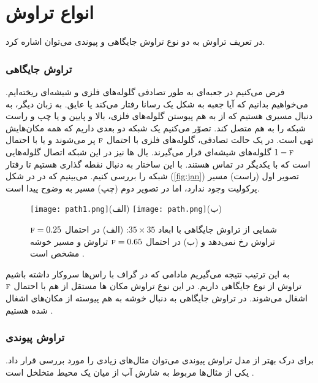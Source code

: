 

\section{انواع تراوش}
در تعریف تراوش به دو نوع تراوش جایگاهی و پیوندی می‌توان اشاره کرد\cite{percolate}. 
\subsubsection{تراوش جایگاهی}
فرض می‌کنیم در جعبه‌ای به طور تصادفی گلوله‌های فلزی و شیشه‌ای ریخته‌ایم. می‌خواهیم بدانیم که آیا جعبه به شکل یک رسانا رفتار می‌کند یا عایق. به زبان دیگر، به دنبال مسیری هستیم که از به هم پیوستن گلوله‌های فلزی، بالا و پایین و یا چپ و راست شبکه را به هم متصل کند. تصوّر می‌کنیم یک شبکه دو بعدی داریم که همه مکان‌هایش تهی است. در یک حالت تصادفی، گلوله‌های فلزی  با احتمال 
$\textsc{f}$
 پر می‌شوند و یا با احتمال
  $1 - \textsc{f}$ 
  گلوله‌های شیشه‌ای قرار می‌گیرند. یال ها نیز در این شبکه اتصال گلوله‌هایی است که با یکدیگر در تماس هستند. با این ساختار به دنبال نقطه گذاری هستیم تا رفتار شبکه را بررسی کنیم. می‌بینیم که در در شکل (\ref{fig:jan})  تصویر اول (راست) مسیر پرکولیت وجود ندارد، اما  در تصویر دوم (چپ) مسیر به وضوح پیدا است. 
\begin{figure}[htbp]
\hspace*{0cm}
\centering
\texttt{[image: path1.png]}\centering(الف)    
\texttt{[image: path.png]}\centering(ب)
\caption[شمایی از تراوش جایگاهی] {\footnotesize شمایی از تراوش جایگاهی با ابعاد $35\times 35$: (الف) در احتمال 
$\textsc{f} = 0.25$ 
تراوش رخ نمی‌دهد و (ب) در احتمال 
$\textsc{f} = 0.65$ 
تراوش و مسیر خوشه مشخص است \cite{bela}.}
\label{fig:site}
\end{figure}
به این ترتیب نتیجه می‌گیریم مادامی که در گراف با راس‌ها سروکار داشته باشیم تراوش از نوع جایگاهی داریم. در این نوع تراوش مکان ها مستقل از هم با احتمال $\textsc{f}$ اشغال می‌شوند. در تراوش جایگاهی به دنبال خوشه به هم پیوسته از مکان‌های اشغال شده هستیم \cite{bela}.
\subsubsection{تراوش پیوندی}
برای درک بهتر از مدل تراوش  پیوندی  می‌توان مثال‌های زیادی را مورد بررسی قرار داد. یکی از مثال‌ها مربوط به شارش آب از میان یک محیط متخلخل است \cite{sahini}.

